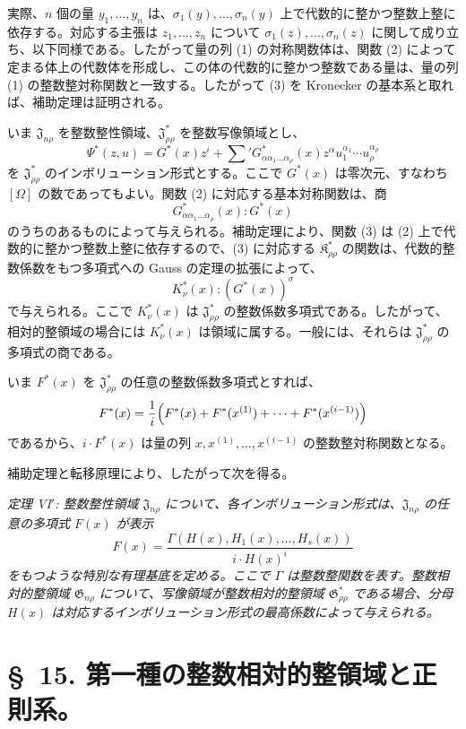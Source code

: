 \documentclass[11pt]{jlreq}
\providecommand{\Kfield}{\mathfrak{K}}
\providecommand{\Jdom}{\mathfrak{J}}
\providecommand{\Gdom}{\mathfrak{G}}
\begin{document}
実際、$n$ 個の量 $y_1,\ldots,y_n$ は、$\sigma_1(y),\ldots,\sigma_n(y)$ 上で代数的に整かつ整数上整に依存する。対応する主張は $z_1,\ldots,z_n$ について $\sigma_1(z),\ldots,\sigma_n(z)$ に関して成り立ち、以下同様である。したがって量の列 (1) の対称関数体は、関数 (2) によって定まる体上の代数体を形成し、この体の代数的に整かつ整数である量は、量の列 (1) の整数整対称関数と一致する。したがって (3) を Kronecker の基本系と取れば、補助定理は証明される。

いま $\Jdom_{n\rho}$ を整数整性領域、$\Jdom^*_{\rho\rho}$ を整数写像領域とし、
\[
  \Psi^*(z,u)=G^*(x)z^i+
  \sum{}'G^*_{\alpha\alpha_1\ldots\alpha_\rho}(x)
  z^\alpha u_1^{\alpha_1}\cdots u_\rho^{\alpha_\rho}
\]
を $\Jdom^*_{\rho\rho}$ のインボリューション形式とする。ここで $G^*(x)$ は零次元、すなわち $[\Omega]$ の数であってもよい。関数 (2) に対応する基本対称関数は、商
\begin{equation}
  G^*_{\alpha\alpha_1\ldots\alpha_\rho}(x):G^*(x)
\tag{4}
\end{equation}
のうちのあるものによって与えられる。補助定理により、関数 (3) は (2) 上で代数的に整かつ整数上整に依存するので、(3) に対応する $\Kfield^*_{\rho\rho}$ の関数は、代数的整数係数をもつ多項式への Gauss の定理の拡張によって、
\begin{equation}
  K_\nu^*(x):(G^*(x))^\sigma
\tag{5}
\end{equation}
で与えられる。ここで $K_\nu^*(x)$ は $\Jdom^*_{\rho\rho}$ の整数係数多項式である。したがって、相対的整領域の場合には $K_\nu^*(x)$ は領域に属する。一般には、それらは $\Jdom^*_{\rho\rho}$ の多項式の商である。

いま $F^*(x)$ を $\Jdom^*_{\rho\rho}$ の任意の整数係数多項式とすれば、
\[
  F^*(x)=\frac1i\Bigl(F^*(x)+F^*(x^{(1)})+\cdots+F^*(x^{(i-1)})\Bigr)
\]
であるから、$i\cdot F^*(x)$ は量の列 $x,x^{(1)},\ldots,x^{(i-1)}$ の整数整対称関数となる。

補助定理と転移原理により、したがって次を得る。

\emph{定理 VI$'$: 整数整性領域 $\Jdom_{n\rho}$ について、各インボリューション形式は、$\Jdom_{n\rho}$ の任意の多項式 $F(x)$ が表示}
\[
  F(x)=\frac{\Gamma(H(x),H_1(x),\ldots,H_s(x))}{i\cdot H(x)^i}
\]
\emph{をもつような特別な有理基底を定める。ここで $\Gamma$ は整数整関数を表す。整数相対的整領域 $\Gdom_{n\rho}$ について、写像領域が整数相対的整領域 $\Gdom^*_{\rho\rho}$ である場合、分母 $H(x)$ は対応するインボリューション形式の最高係数によって与えられる。}

\section*{\S\ 15. 第一種の整数相対的整領域と正則系。}
\end{document}
